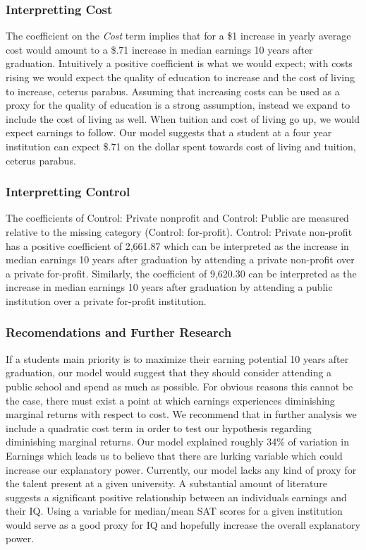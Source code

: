 \documentclass[%
 reprint,
 amsmath,amssymb,
 aps,
]{revtex4-1}
\begin{document}
\subsubsection{Interpretting Cost}
The coefficient on the \textit{Cost} term implies that for a \$1 increase in yearly average cost would amount to a \$.71 increase in median earnings 10 years after graduation. Intuitively a positive coefficient is what we would expect; with costs rising we would expect the quality of education to increase and the cost of living to increase, ceterus parabus. Assuming that increasing costs can be used as a proxy for the quality of education is a strong assumption, instead we expand to include the cost of living as well. When tuition and cost of living go up, we would expect earnings to follow. Our model suggests that a student at a four year institution can expect \$.71 on the dollar spent towards cost of living and tuition, ceterus parabus. 

\subsubsection{Interpretting Control}
The coefficients of Control: Private nonprofit and Control: Public are measured relative to the missing category (Control: for-profit).  Control: Private non-profit has a positive coefficient of 2,661.87 which can be interpreted as the increase in median earnings 10 years after graduation by attending a private non-profit over a private for-profit.  Similarly, the coefficient of 9,620.30 can be interpreted as the increase in median earnings 10 years after graduation by attending a public institution over a private for-profit institution.


\subsubsection{Recomendations and Further Research}
If a students main priority is to maximize their earning potential 10 years after graduation, our model would suggest that they should consider attending a public school and spend as much as possible. For obvious reasons this cannot be the case, there must exist a point at which earnings experiences diminishing marginal returns with respect to cost. We recommend that in further analysis we include a quadratic cost term in order to test our hypothesis regarding diminishing marginal returns. Our model explained roughly 34\% of variation in Earnings which leads us to believe that there are lurking variable which could increase our explanatory power.  Currently, our model lacks any kind of proxy for the talent present at a given university.  A substantial amount of literature suggests a significant positive relationship between an individuals earnings and their IQ. Using a variable for median/mean SAT scores for a given institution would serve as a good proxy for IQ and hopefully increase the overall explanatory power.  
\end{document}
